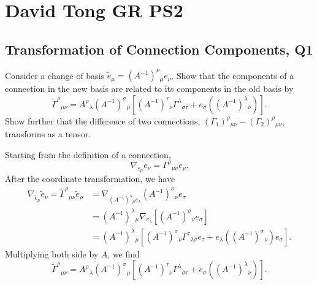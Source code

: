 \section{David Tong GR PS2}

\subsection{Transformation of Connection Components, Q1}

Consider a change of basis $\tilde{e}_\mu = (A^{-1})^\nu{}_\mu e_\nu$. Show that the components of a connection in the new basis are related to its components in the old basis by
\begin{equation}
    \tilde{\Gamma}^\rho{}_{\mu\nu} = A^\rho{}_\lambda (A^{-1})^\sigma{}_\mu\left[(A^{-1})^\tau{}_\nu\Gamma^\lambda{}_{\sigma\tau} + e_\sigma((A^{-1})^\lambda{}_\nu)\right].
\end{equation}
Show further that the difference of two connections, $(\Gamma_1)^\rho{}_{\mu\nu} - (\Gamma_2)^\rho{}_{\mu\nu}$, transforms as a tensor.

\begin{solution}
    Starting from the definition of a connection,
    \begin{equation}
        \nabla_{e_\mu} e_\nu = \Gamma^\rho {}_{\mu\nu} e_\rho.
    \end{equation}
    After the coordinate transformation, we have
    \begin{equation}
    \begin{aligned}
        \nabla_{\tilde{e}_\mu} \tilde{e}_\nu = \tilde{\Gamma}^\rho {}_{\mu\nu} \tilde{e}_\rho &= \nabla_{(A^{-1})^\lambda{}_\mu e_\lambda}(A^{-1})^\sigma{}_\nu e_\sigma\\
        &=(A^{-1})^\lambda{}_\mu\nabla_{e_\lambda}[(A^{-1})^\sigma{}_\nu e_\sigma]\\
        &= (A^{-1})^\lambda{}_\mu\left[(A^{-1})^\sigma{}_\nu \Gamma^\tau {}_{\lambda\sigma} e_\tau + e_\lambda((A^{-1})^\sigma{}_\nu)e_\sigma \right].
    \end{aligned}
    \end{equation}
    Multiplying both side by $A$, we find
    \begin{equation}
        \tilde{\Gamma}^\rho{}_{\mu\nu} = A^\rho{}_\lambda (A^{-1})^\sigma{}_\mu\left[(A^{-1})^\tau{}_\nu\Gamma^\lambda{}_{\sigma\tau} + e_\sigma((A^{-1})^\lambda{}_\nu)\right].
    \end{equation}
\end{solution}

